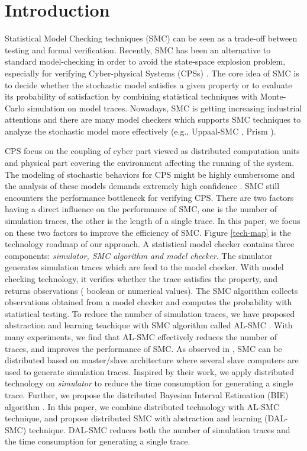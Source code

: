 \section{Introduction}

Statistical Model Checking techniques (SMC) \cite{Younes2004Planning,Sen2004Statistical,herault2004} can be seen as a trade-off between testing and formal verification. Recently, SMC has been an alternative to standard model-checking in order to avoid the state-space explosion problem, especially for verifying Cyber-physical Systems (CPSs) \cite{Yoo2016Challenges}. The core idea of SMC is to decide whether the stochastic model satisfies a given property or to evaluate its probability of satisfaction by combining statistical techniques with Monte-Carlo simulation on model traces. Nowadays, SMC is getting increasing industrial attentions and there are many model checkers which supports SMC techniques to analyze the stochastic model more effectively (e.g., Uppaal-SMC \cite{Bulychev2012UPPAAL}, Prism \cite{Kwiatkowska2002PRISM}).

CPS focus on the coupling of cyber part viewed as distributed computation units and physical part covering the environment affecting the running of the system. The modeling of stochastic behaviors for CPS might be highly cumbersome \cite{basu2010statistical} and the analysis of these models demands extremely high confidence \cite{du2015smc4rare}. SMC still encounters the performance bottleneck for verifying CPS. There are two factors having a direct influence on the performance of SMC, one is the number of simulation traces, the other is the length of a single trace.  In this paper, we focus on these two factors to improve the efficiency of SMC. Figure \ref{tech-map} is the technology roadmap of our approach. A statistical model checker contains three components: \emph{simulator, SMC algorithm and model checker}. The simulator generates simulation traces which are feed to the model checker.  With model checking technology, it verifies whether the trace satisfies the property, and returns observations ( boolean or numerical values). The SMC algorithm collects observations obtained from a model checker and computes the probability with statistical testing. To reduce the number of simulation traces, we have proposed abstraction and learning teachique with SMC algorithm called AL-SMC \cite{jiangkaiqiang2016}. With many experiments, we find that AL-SMC effectively reduces the number of traces, and improves the performance of SMC. As observed in \cite{younes2005ymer}, SMC can be distributed based on master/slave architecture where several slave computers are used to generate simulation traces. Inspired by their work, we apply distributed technology on \emph{simulator} to reduce the time consumption for generating a single trace. Further, we propose the distributed Bayesian Interval Estimation (BIE) algorithm \cite{zuliani2013bayesian}. In this paper, we combine distributed technology with AL-SMC technique, and propose distributed SMC with abstraction and learning (DAL-SMC) technique.  DAL-SMC reduces both the number of simulation traces and the time consumption for generating a single trace.


